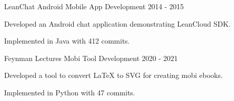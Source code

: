 \begin{cventries}
  \cventry
    {LeanChat Android} %
    {Mobile App Development} %
    {} %
    {2014 - 2015} %
    {
      \begin{cvitems}
        \item {Developed an Android chat application demonstrating LeanCloud SDK.}
        \item {Implemented in Java with 412 commits.}
      \end{cvitems}
    }

  \cventry
    {Feynman Lectures Mobi} %
    {Tool Development} %
    {} %
    {2020 - 2021} %
    {
      \begin{cvitems}
        \item {Developed a tool to convert LaTeX to SVG for creating mobi ebooks.}
        \item {Implemented in Python with 47 commits.}
      \end{cvitems}
    }

\end{cventries}

